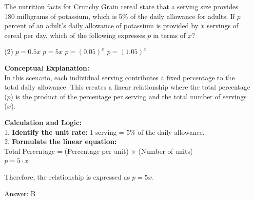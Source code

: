 \documentclass[11pt,paper=a4,answers]{exam}
\begin{document}
\begin{questions}
\pointsinrightmargin
\pointsdroppedatright
\marksnotpoints
{}
\pointformat{\boldmath\themarginpoints}
\bracketedpoints


\question
The nutrition facts for Crunchy Grain cereal state that a serving size provides 180 milligrams of potassium, which is 5\% of the daily allowance for adults. If $p$ percent of an adult's daily allowance of potassium is provided by $x$ servings of cereal per day, which of the following expresses $p$ in terms of $x$?
\begin{tasks}(2)
    \task $p = 0.5x$
    \task $p = 5x$
    \task $p = (0.05)^x$
    \task $p = (1.05)^x$
\end{tasks}

\begin{solution}
\textbf{Conceptual Explanation:} \\
In this scenario, each individual serving contributes a fixed percentage to the total daily allowance. This creates a linear relationship where the total percentage ($p$) is the product of the percentage per serving and the total number of servings ($x$).

\vspace{30pt}

\textbf{Calculation and Logic:} \\
1. \textbf{Identify the unit rate:} 1 serving = 5\% of the daily allowance. \\
2. \textbf{Formulate the linear equation:} \\
   Total Percentage = (Percentage per unit) $\times$ (Number of units) \\
   $p = 5 \cdot x$

\vspace{15pt}

Therefore, the relationship is expressed as $p = 5x$.

\vspace{30pt}

Answer: \colorbox{yellow!100}{B}
\end{solution}

\vspace{60pt}


\end{questions}
\end{document}
